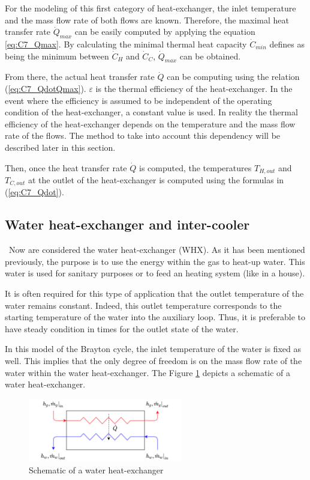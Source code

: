 For the modeling of this first category of heat-exchanger, the inlet temperature and the mass flow rate of both flows are known. Therefore, the maximal heat transfer rate  $\dot{Q}_{max}$ can be easily computed by applying the equation \ref{eq:C7_Qmax}. By calculating the minimal thermal heat capacity $\dot{C}_{min}$ defines as being the minimum between $\dot{C}_H$ and $\dot{C}_C$, $\dot{Q}_{max}$ can be obtained.

From there, the actual heat transfer rate $\dot{Q}$ can be computing using the relation (\ref{eq:C7_QdotQmax}). $\varepsilon$ is the thermal efficiency of the heat-exchanger. In the event where the efficiency is assumed to be independent of the operating condition of the heat-exchanger, a constant value is used. In reality the thermal efficiency of the heat-exchanger depends on the temperature and the mass flow rate of the flows. The method to take into account this dependency will be described later in this section.

Then, once the heat transfer rate $\dot{Q}$ is computed, the temperatures $T_{H,out}$ and $T_{C,out}$ at the outlet of the heat-exchanger is computed using the formulas in (\ref{eq:C7_Qdot}).

\subsection{Water heat-exchanger and inter-cooler}
\quad\ Now are considered the water heat-exchanger (WHX). As it has been mentioned previously, the purpose is to use the energy within the gas to heat-up water. This water is used for sanitary purposes or to feed an heating system (like in a house). 

It is often required for this type of application that the outlet temperature of the water remains constant. Indeed, this outlet temperature corresponds to the starting temperature of the water into the auxiliary loop. Thus, it is preferable to have steady condition in times for the outlet state of the water.

In this model of the Brayton cycle, the inlet temperature of the water is fixed as well. This implies that the only degree of freedom is on the mass flow rate of the water within the water heat-exchanger. The Figure \ref{fig:C7_WHX} depicts a schematic of a water heat-exchanger.

\begin{figure}[h]
    \centering
    \includegraphics[width=0.6\textwidth]{Chapitre_7/Images/WHX.png}
    \caption{Schematic of a water heat-exchanger}
    \label{fig:C7_WHX}
\end{figure}

